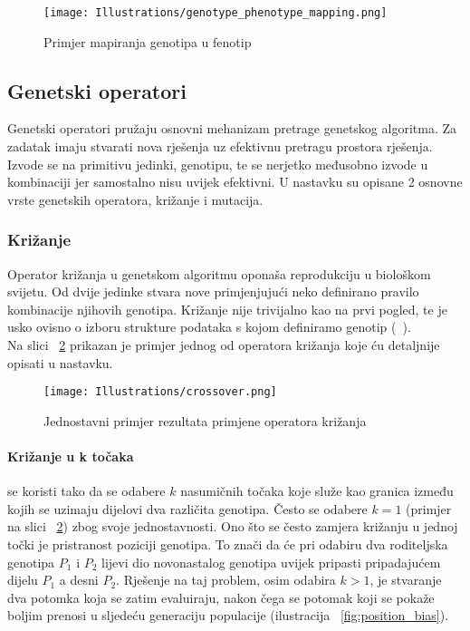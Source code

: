 \begin{figure}
	\centering
	\texttt{[image: Illustrations/genotype\_phenotype\_mapping.png]}
	\caption{Primjer mapiranja genotipa u fenotip}
	\label{fig:genotype_phenotype_map}
\end{figure}

\subsection{Genetski operatori}
Genetski operatori pružaju osnovni mehanizam pretrage genetskog algoritma.
Za zadatak imaju stvarati nova rješenja uz efektivnu pretragu prostora rješenja.
Izvode se na primitivu jedinki, genotipu, te se nerjetko međusobno izvode u kombinaciji jer samostalno nisu uvijek efektivni.
U nastavku su opisane 2 osnovne vrste genetskih operatora, križanje i mutacija.

\subsubsection{Križanje}
Operator križanja u genetskom algoritmu oponaša reprodukciju u biološkom svijetu.
Od dvije jedinke stvara nove primjenjujući neko definirano pravilo kombinacije njihovih genotipa.
Križanje nije trivijalno kao na prvi pogled, te je usko ovisno o izboru strukture podataka s kojom definiramo genotip (~\cite{wong2015evolutionary}). \\
Na slici ~\ref{fig:crossover} prikazan je primjer jednog od operatora križanja koje ću detaljnije opisati u nastavku.

\begin{figure}
	\texttt{[image: Illustrations/crossover.png]}
	\caption{Jednostavni primjer rezultata primjene operatora križanja}
	\label{fig:crossover}
\end{figure}

\paragraph{Križanje u k točaka}
se koristi tako da se odabere $k$ nasumičnih točaka koje služe kao granica između kojih se uzimaju dijelovi dva različita genotipa.
Često se odabere $k = 1$ (primjer na slici ~\ref{fig:crossover}) zbog svoje jednostavnosti.
Ono što se često zamjera križanju u jednoj točki je pristranost poziciji genotipa.
To znači da će pri odabiru dva roditeljska genotipa $P_1$ i $P_2$ lijevi dio novonastalog genotipa uvijek pripasti pripadajućem dijelu $P_1$ a desni $P_2$.
Rješenje na taj problem, osim odabira $k > 1$, je stvaranje dva potomka koja se zatim evaluiraju, nakon čega se potomak koji se pokaže boljim prenosi u sljedeću generaciju populacije (ilustracija ~\ref{fig:position_bias}).

